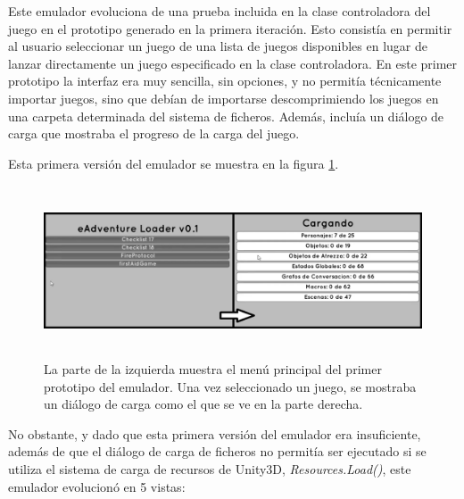 Este emulador evoluciona de una prueba incluida en la clase controladora del juego en el prototipo generado en la primera iteración. Esto consistía en permitir al usuario seleccionar un juego de una lista de juegos disponibles en lugar de lanzar directamente un juego especificado en la clase controladora. En este primer prototipo la interfaz era muy sencilla, sin opciones, y no permitía técnicamente importar juegos, sino que debían de importarse descomprimiendo los juegos en una carpeta determinada del sistema de ficheros. Además, incluía un diálogo de carga que mostraba el progreso de la carga del juego.

Esta primera versión del emulador se muestra en la figura \ref{betaemuit3}.

\begin{figure}[htb]
	\centerline{\includegraphics[height=2in]{figures/it3/betaemu.png}}
	\caption[Primer prototipo - Emulador]{La parte de la izquierda muestra el menú principal del primer prototipo del emulador. Una vez seleccionado un juego, se mostraba un diálogo de carga como el que se ve en la parte derecha.}
	\label{betaemuit3}
\end{figure}

No obstante, y dado que esta primera versión del emulador era insuficiente, además de que el diálogo de carga de ficheros no permitía ser ejecutado si se utiliza el sistema de carga de recursos de Unity3D, \textit{Resources.Load()}, este emulador evolucionó en 5 vistas:

